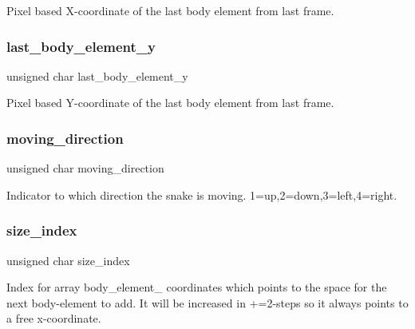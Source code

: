 Pixel based X-\/coordinate of the last body element from last frame. \hypertarget{structsnake__struct_a058ae4f8fa7ee37be988277b1a231a6f}{}\label{structsnake__struct_a058ae4f8fa7ee37be988277b1a231a6f} 
\subsubsection{\texorpdfstring{last\+\_\+body\+\_\+element\+\_\+y}{last\_body\_element\_y}}
{\footnotesize\ttfamily unsigned char last\+\_\+body\+\_\+element\+\_\+y}

Pixel based Y-\/coordinate of the last body element from last frame. \hypertarget{structsnake__struct_aab0070520b89a005e175de518bbf8d76}{}\label{structsnake__struct_aab0070520b89a005e175de518bbf8d76} 
\subsubsection{\texorpdfstring{moving\+\_\+direction}{moving\_direction}}
{\footnotesize\ttfamily unsigned char moving\+\_\+direction}

Indicator to which direction the snake is moving. 1=up,2=down,3=left,4=right. \hypertarget{structsnake__struct_a908b761eeaa385c331d29721c74fbd56}{}\label{structsnake__struct_a908b761eeaa385c331d29721c74fbd56} 
\subsubsection{\texorpdfstring{size\+\_\+index}{size\_index}}
{\footnotesize\ttfamily unsigned char size\+\_\+index}

Index for array \textquotesingle{}body\+\_\+element\+\_\+ coordinates\textquotesingle{} which points to the space for the next body-\/element to add. It will be increased in +=2-\/steps so it always points to a free x-\/coordinate. \hypertarget{structsnake__struct_a5b4861c8a096bac3fcc718c702265fb2}{}\label{structsnake__struct_a5b4861c8a096bac3fcc718c702265fb2} 
